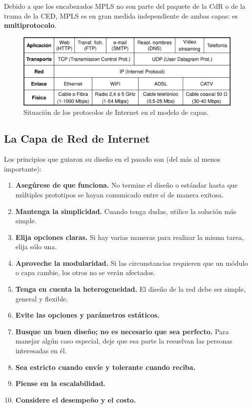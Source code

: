 \documentclass[10pt,a4paper]{article}
\begin{document}
Debido a que los encabezados MPLS no son parte del paquete de la CdR o de la trama de la CED, MPLS es en gran medida independiente de ambas capas: es \textbf{multiprotocolo}.

\begin{figure}[ht!]
  \caption{Situación de los protocolos de Internet en el modelo de capas.}
  \label{fig:protocolos_situacion}
  \centerline{\includegraphics[width=0.85\textwidth-\fboxrule-\fboxrule]{imgs/protocolos_situacion.png}}
\end{figure}

\subsection{La Capa de Red de Internet}

Los principios que guiaron su diseño en el pasado son (del más al menos importante):

\begin{enumerate}
\item \textbf{Asegúrese de que funciona.} No termine el diseño o estándar hasta que múltiples prototipos se hayan comunicado entre sí de manera exitosa.
\item \textbf{Mantenga la simplicidad.} Cuando tenga dudas, utilice la solución más simple.
\item \textbf{Elija opciones claras.} Si hay varias maneras para realizar la misma tarea, elija sólo una.
\item \textbf{Aproveche la modularidad.} Si las circunstancias requieren que un módulo o capa cambie, los otros no se verán afectados.
\item \textbf{Tenga en cuenta la heterogeneidad.} El diseño de la red debe ser simple, general y flexible.
\item \textbf{Evite las opciones y parámetros estáticos.}
\item \textbf{Busque un buen diseño; no es necesario que sea perfecto.} Para manejar algún caso especial, deje que esa parte la resuelvan las personas interesadas en él.
\item \textbf{Sea estricto cuando envíe y tolerante cuando reciba.}
\item \textbf{Piense en la escalabilidad.}
\item \textbf{Considere el desempeño y el costo.}
\end{enumerate}
\end{document}
